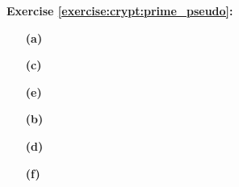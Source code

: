 
\noindent\textbf{Exercise \ref{exercise:crypt:prime_pseudo}:}
%  
% 
\begin{itemize}
 
 \item[{\bf (a)}]
 
 \item[{\bf (c)}]
 
 \item[{\bf (e)}]
 
\end{itemize}
\begin{itemize}
 
 \item[{\bf (b)}]
 
 \item[{\bf (d)}]
 
 \item[{\bf (f)}]
 
\end{itemize}
% 

